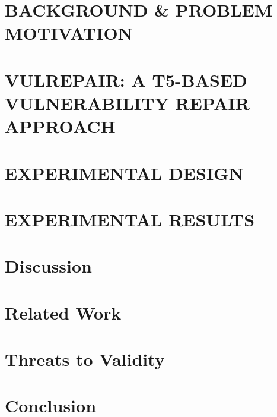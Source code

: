 \documentclass[sigconf,nonacm]{acmart}
\begin{document}
\section{BACKGROUND & PROBLEM MOTIVATION}


\section{VULREPAIR: A T5-BASED VULNERABILITY REPAIR APPROACH}


\section{EXPERIMENTAL DESIGN}


\section{EXPERIMENTAL RESULTS}


\section{Discussion}


\section{Related Work}


\section{Threats to Validity}


\section{Conclusion}




\end{document}
